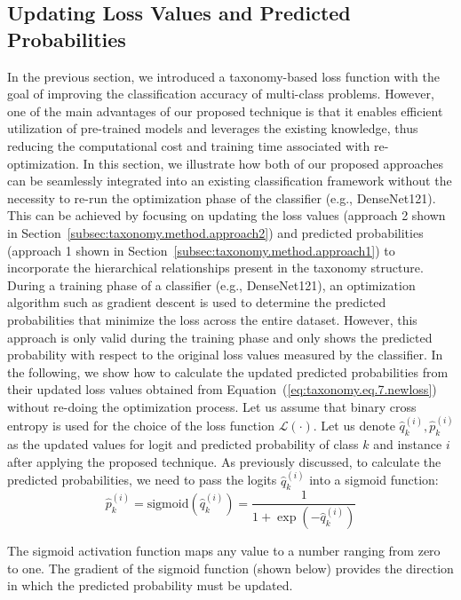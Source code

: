 \documentclass[final,1p,times,authoryear]{elsarticle}
\begin{document}
\subsection{Updating Loss Values and Predicted Probabilities}\label{subsec:updating-loss-values-and-predicted-probabilities}
In the previous section, we introduced a taxonomy-based loss function with the goal of improving the classification accuracy of multi-class problems. However, one of the main advantages of our proposed technique is that it enables efficient utilization of pre-trained models and leverages the existing knowledge, thus reducing the computational cost and training time associated with re-optimization. In this section, we illustrate how both of our proposed approaches can be seamlessly integrated into an existing classification framework without the necessity to re-run the optimization phase of the classifier (e.g., DenseNet121). This can be achieved by focusing on updating the loss values (approach 2 shown in Section~\ref{subsec:taxonomy.method.approach2}) and predicted probabilities (approach 1 shown in Section~\ref{subsec:taxonomy.method.approach1}) to incorporate the hierarchical relationships present in the taxonomy structure.
During a training phase of a classifier (e.g., DenseNet121), an optimization algorithm such as gradient descent is used to determine the predicted probabilities that minimize the loss across the entire dataset. However, this approach is only valid during the training phase and only shows the predicted probability with respect to the original loss values measured by the classifier.
In the following, we show how to calculate the updated predicted probabilities from their updated loss values obtained from Equation~(\ref{eq:taxonomy.eq.7.newloss}) without re-doing the optimization process. Let us assume that binary cross entropy is used for the choice of the loss function $\mathcal{L}(\cdot) $. Let us denote $\widehat{q}_k^{(i)}, \widehat{p}_k^{(i)} $ as the updated values for logit and predicted probability of class $k $ and instance $i $ after applying the proposed technique. As previously discussed, to calculate the predicted probabilities, we need to pass the logits ${\widehat q}_k^{(i)} $ into a sigmoid function:
\begin{equation}
    \label{eq:taxonomy.eq.9.sigmoid}
    \widehat{p}_k^{(i)}=\text{sigmoid}\left(\widehat{q}_k^{(i)}\right)=\frac1{1+\exp\left(-\widehat{q}_k^{(i)}\right)}
\end{equation}

The sigmoid activation function maps any value to a number ranging from zero to one. The gradient of the sigmoid function (shown below) provides the direction in which the predicted probability must be updated.
\end{document}
